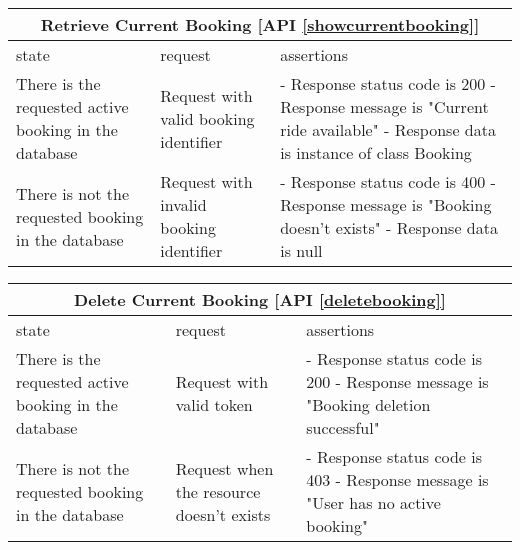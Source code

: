 \begin{center}
	\begin{tabular}{|p{}|p{}|p{}|}
		\hline
		\multicolumn{3}{c}{Retrieve Current Booking [API \ref{showcurrentbooking}]}\\
		
		\hline
		state & request & assertions \\
		
		\hline
		There is the requested active booking in the database &
		Request with valid booking identifier & 
		- Response status code is 200 \newline
		- Response message is "Current ride available" \newline
		- Response data is instance of class Booking
		\\
		
		\hline
		There is not the requested booking in the database &
		Request with invalid booking identifier & 
		- Response status code is 400 \newline
		- Response message is "Booking doesn't exists" \newline
		- Response data is null
		\\
		
		\hline
	\end{tabular}
\end{center}

\begin{center}
	\begin{tabular}{|p{}|p{}|p{}|}
		\hline
		\multicolumn{3}{c}{Delete Current Booking [API \ref{deletebooking}]}\\
		
		\hline
		state & request & assertions \\
		
		\hline
		There is the requested active booking in the database &
		Request with valid token & 
		- Response status code is 200 \newline
		- Response message is "Booking deletion successful" \newline
		\\
		
		\hline
		There is not the requested booking in the database &
		Request when the resource doesn't exists & 
		- Response status code is 403 \newline
		- Response message is "User has no active booking" \newline
		\\
		
		\hline
	\end{tabular}
\end{center}

